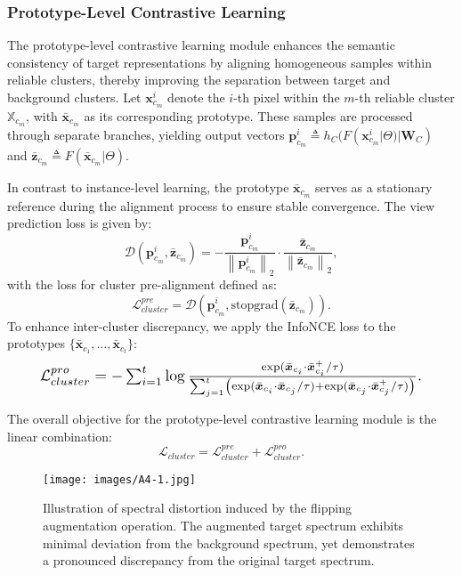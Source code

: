\subsubsection{Prototype-Level Contrastive Learning}\label{sec3.1.2}
The prototype-level contrastive learning module enhances the semantic consistency of target representations by aligning homogeneous samples within reliable clusters, thereby improving the separation between target and background clusters.  
Let $\bm{x}_{c_m}^{i}$ denote the $i$-th pixel within the $m$-th reliable cluster $\mathbb{X}_{c_m}$, with $\bar{\bm{x}}_{c_m}$ as its corresponding prototype. These samples are processed through separate branches, yielding output vectors $\bm{p}^{i}_{c_{m}} \triangleq h_{C}(F(\bm{x}^{i}_{c_m}|\Theta)|\bm{W}_C)$ and $\bar{\bm{z}}_{c_{m}} \triangleq F(\bar{\bm{x}}_{c_m}|\Theta)$.

In contrast to instance-level learning, the prototype $\bar{\bm{x}}_{c_m}$ serves as a stationary reference during the alignment process to ensure stable convergence. The view prediction loss is given by:
\begin{equation}\label{eq:5}   
    \mathcal{D}\left(\bm{p}^{i}_{c_{m}}, \bar{\bm{z}}_{c_{m}}\right)=-\frac{\bm{p}^{i}_{c_{m}}}{\left\|\bm{p}^{i}_{c_{m}}\right\|_2} \cdot \frac{\bar{\bm{z}}_{c_{m}}}{\left\|\bar{\bm{z}}_{c_{m}}\right\|_2},
\end{equation}
with the loss for cluster pre-alignment defined as:
\begin{equation}\label{eq:6} 
    \mathcal{L}_{cluster}^{pre} = \mathcal{D}\left(\bm{p}^{i}_{c_{m}}, \text{stopgrad}(\bar{\bm{z}}_{c_{m}})\right).
\end{equation}
To enhance inter-cluster discrepancy, we apply the InfoNCE loss to the prototypes $\{\bar{\bm{x}}_{c_1}, \dots, \bar{\bm{x}}_{c_t}\}$:
\begin{equation}\label{eq:7} 
    \resizebox{0.89\hsize}{!}{$\mathcal{L}_{cluster}^{pro}=-\sum_{i=1}^t\log \frac{\exp (\bar{\bm{x}}_{c_i} \cdot \bar{\bm{x}}_{c_i}^{+} / \tau)} {\sum_{j=1}^t \left(\exp (\bar{\bm{x}}_{c_i} \cdot \bar{\bm{x}}_{c_j} / \tau) + \exp (\bar{\bm{x}}_{c_j} \cdot \bar{\bm{x}}_{c_j}^{+} / \tau)\right)}.$}
\end{equation}
\par
The overall objective for the prototype-level contrastive learning module is the linear combination:
\begin{equation}\label{eq:8} 
    \mathcal{L}_{cluster} = \mathcal{L}_{cluster}^{pre} + \mathcal{L}_{cluster}^{pro}.
\end{equation}
\begin{figure}[!ht]                  
    \centering                    
    \texttt{[image: images/A4-1.jpg]}                     
    \caption{Illustration of spectral distortion induced by the flipping augmentation operation. The augmented target spectrum exhibits minimal deviation from the background spectrum, yet demonstrates a pronounced discrepancy from the original target spectrum.}              
    \label{fig:aug}    
\end{figure}
